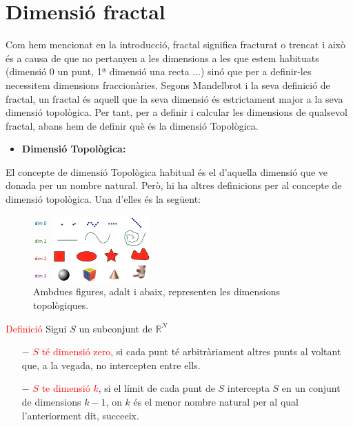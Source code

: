 \documentclass[12pt]{report}
\begin{document}
 

\section{Dimensió fractal}
Com hem mencionat en la introducció, fractal significa fracturat o trencat i això és a causa de que no pertanyen a les dimensions a les que estem habituats (dimensió 0 un punt, 1ª dimensió una recta ...) sinó que per a definir-les necessitem dimensions fraccionàries.
\newline
Segons Mandelbrot i la seva definició de fractal, un fractal és aquell que la seva dimensió és estrictament major a la seva dimensió topològica. Per tant, per a definir i calcular les dimensions de qualsevol fractal, abans hem de definir què és la dimensió Topològica.
\begin{itemize}
\item \textbf{Dimensió Topològica:}
\end{itemize}

    
El concepte de dimensió Topològica habitual és el d'aquella dimensió que ve donada per un nombre natural. Però, hi ha altres definicions per al concepte de dimensió topològica. Una d'elles és la següent:

\begin{figure}
    \includegraphics[width=0.4\textwidth]{Dim.PNG}
    \caption{Ambdues figures, adalt i abaix, representen les dimensions topològiques.}
    \end{figure}
\textcolor{red}{Definició} Sigui $S$ un subconjunt de $\mathbb{R}^N$ 
\begin{itemize}
\item [$-$] \textcolor{red}{$S$ té dimensió zero}, si cada punt té arbitràriament altres punts al voltant que, a la vegada, no intercepten entre ells.
\end{itemize}
\begin{itemize}
\item [$-$] \textcolor{red}{$S$ te dimensió $k$}, si el límit de cada punt de $S$ intercepta $S$ en un conjunt de dimensions $k-1$, on $k$ és el menor nombre natural per al qual l'anteriorment dit, succeeix.
\newline
\newline
\end{itemize}
\end{document}
